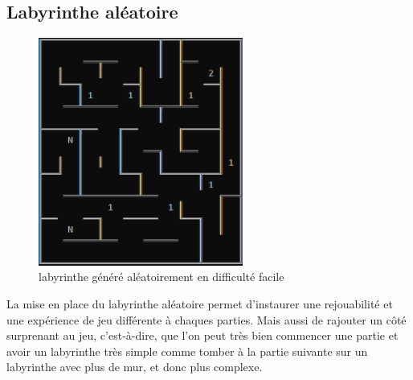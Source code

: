 \documentclass[12pt,a4paper,twoside]{article}
\begin{document}
\subsection{Labyrinthe aléatoire}
\begin{figure}[h]
\centering
\includegraphics[width=0.6\textwidth]{laby_dern.png}
\caption{labyrinthe généré aléatoirement en difficulté facile}
\end{figure}
\newpage
La mise en place du labyrinthe aléatoire permet d'instaurer une rejouabilité et une expérience de jeu différente à chaques parties. Mais aussi de rajouter un côté surprenant au jeu, c'est-à-dire, que l'on peut très bien commencer une partie et avoir un labyrinthe très simple comme tomber à la partie suivante sur un labyrinthe avec plus de mur, et donc plus complexe.
\end{document}
